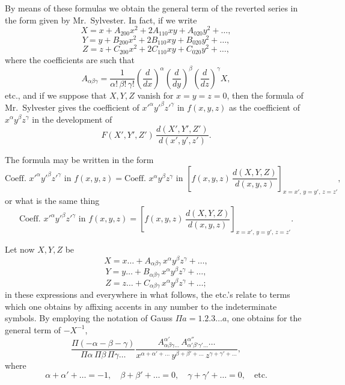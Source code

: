 \documentclass[11pt,a4paper]{book}
\begin{document}
\setcounter{page}{58}

By means of these formulas we obtain the general term of the reverted series in the form given by Mr.~Sylvester. In fact, if we write
\[
X = x + A_{200}x^2 + 2A_{110}xy + A_{020}y^2 + \ldots,
\]
\[
Y = y + B_{200}x^2 + 2B_{110}xy + B_{020}y^2 + \ldots,
\]
\[
Z = z + C_{200}x^2 + 2C_{110}xy + C_{020}y^2 + \ldots,
\]
where the coefficients are such that
\[
A_{\alpha\beta\gamma} = \frac{1}{\alpha!\,\beta!\,\gamma!}
\left(\frac{d}{dx}\right)^\alpha
\left(\frac{d}{dy}\right)^\beta
\left(\frac{d}{dz}\right)^\gamma X,
\]
etc., and if we suppose that $X,Y,Z$ vanish for $x=y=z=0$, then the formula of Mr.~Sylvester gives the coefficient of $x'^\alpha y'^\beta z'^\gamma$ in $f(x,y,z)$ as the coefficient of $x^\alpha y^\beta z^\gamma$ in the development of
\[
F(X',Y',Z')\,\frac{d(X',Y',Z')}{d(x',y',z')}.
\]

The formula may be written in the form
\[
\text{Coeff. } x'^\alpha y'^\beta z'^\gamma \text{ in } f(x,y,z)
= \text{Coeff. } x^\alpha y^\beta z^\gamma \text{ in }
\left[ f(x,y,z)\,\frac{d(X,Y,Z)}{d(x,y,z)} \right]_{x=x',\,y=y',\,z=z'},
\]
or what is the same thing
\[
\text{Coeff. } x'^\alpha y'^\beta z'^\gamma \text{ in } f(x,y,z)
= \left[ f(x,y,z)\,\frac{d(X,Y,Z)}{d(x,y,z)} \right]_{x=x',\,y=y',\,z=z'}.
\]

\setcounter{page}{59}

Let now $X,Y,Z$ be
\[
X = x\ldots + A_{\alpha\beta\gamma}\,x^\alpha y^\beta z^\gamma + \ldots,
\]
\[
Y = y\ldots + B_{\alpha\beta\gamma}\,x^\alpha y^\beta z^\gamma + \ldots,
\]
\[
Z = z\ldots + C_{\alpha\beta\gamma}\,x^\alpha y^\beta z^\gamma + \ldots;
\]
in these expressions and everywhere in what follows, the etc.'s relate to terms which one obtains by affixing accents in any number to the indeterminate symbols. By employing the notation of Gauss $\Pi a = 1.2.3\ldots a$, one obtains for the general term of $-X^{-1}$,
\[
\frac{\Pi(-\alpha-\beta-\gamma)}{\Pi\alpha\,\Pi\beta\,\Pi\gamma\ldots}
\frac{A_{\alpha\beta\gamma\ldots}^{\alpha'}\,A_{\alpha'\beta'\gamma'\ldots}^{\alpha''}\ldots}
{x^{\alpha+\alpha'+\ldots}\,y^{\beta+\beta'+\ldots}\,z^{\gamma+\gamma'+\ldots}},
\]
where
\[
\alpha + \alpha' + \ldots = -1, \quad
\beta + \beta' + \ldots = 0, \quad
\gamma + \gamma' + \ldots = 0, \quad \text{etc.}
\]

\setcounter{page}{60}
\end{document}
